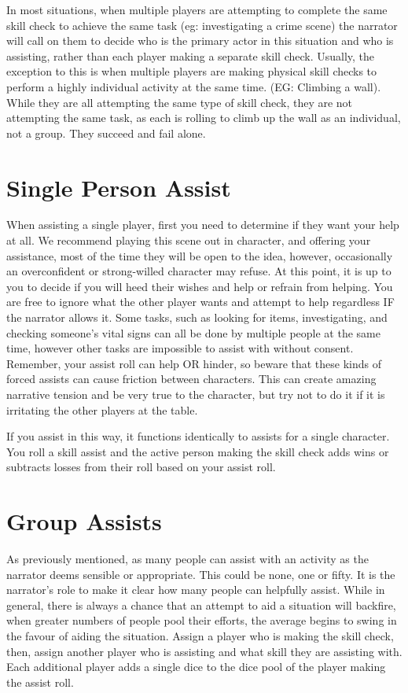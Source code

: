 In most situations, when multiple players are attempting to complete the same skill check to achieve the same task (eg: investigating a crime scene) the narrator will call on them to decide who is the primary actor in this situation and who is assisting, rather than each player making a separate skill check. Usually, the exception to this is when multiple players are making physical skill checks to perform a highly individual activity at the same time. (EG: Climbing a wall). While they are all attempting the same type of skill check, they are not attempting the same task, as each is rolling to climb up the wall as an individual, not a group. They succeed and fail alone.

\section{Single Person Assist} \label{sec:single_person_assist}

When assisting a single player, first you need to determine if they want your help at all. We recommend playing this scene out in character, and offering your assistance, most of the time they will be open to the idea, however, occasionally an overconfident or strong-willed character may refuse. At this point, it is up to you to decide if you will heed their wishes and help or refrain from helping. You are free to ignore what the other player wants and attempt to help regardless IF the narrator allows it. Some tasks, such as looking for items, investigating, and checking someone’s vital signs can all be done by multiple people at the same time, however other tasks are impossible to assist with without consent. Remember, your assist roll can help OR hinder, so beware that these kinds of forced assists can cause friction between characters. This can create amazing narrative tension and be very true to the character, but try not to do it if it is irritating the other players at the table.

If you assist in this way, it functions identically to assists for a single character. You roll a skill assist and the active person making the skill check adds wins or subtracts losses from their roll based on your assist roll.

\section{Group Assists} \label{sec:group_assists}

As previously mentioned, as many people can assist with an activity as the narrator deems sensible or appropriate. This could be none, one or fifty. It is the narrator’s role to make it clear how many people can helpfully assist. While in general, there is always a chance that an attempt to aid a situation will backfire, when greater numbers of people pool their efforts, the average begins to swing in the favour of aiding the situation. Assign a player who is making the skill check, then, assign another player who is assisting and what skill they are assisting with. Each additional player adds a single dice to the dice pool of the player making the assist roll.

